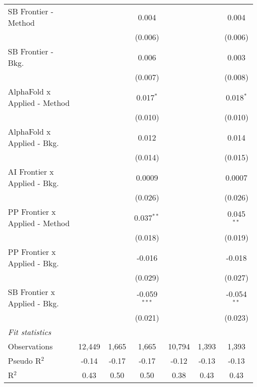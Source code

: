 \begin{tabular}{lcccccc}
   SB Frontier - Method           &               &               & 0.004          &               &             & 0.004\\   
                                  &               &               & (0.006)        &               &             & (0.006)\\   
   SB Frontier - Bkg.             &               &               & 0.006          &               &             & 0.003\\   
                                  &               &               & (0.007)        &               &             & (0.008)\\   
   AlphaFold x Applied - Method   &               &               & 0.017$^{*}$    &               &             & 0.018$^{*}$\\   
                                  &               &               & (0.010)        &               &             & (0.010)\\   
   AlphaFold x Applied - Bkg.     &               &               & 0.012          &               &             & 0.014\\   
                                  &               &               & (0.014)        &               &             & (0.015)\\   
   AI Frontier x Applied - Bkg.   &               &               & 0.0009         &               &             & 0.0007\\   
                                  &               &               & (0.026)        &               &             & (0.026)\\   
   PP Frontier x Applied - Method &               &               & 0.037$^{**}$   &               &             & 0.045$^{**}$\\   
                                  &               &               & (0.018)        &               &             & (0.019)\\   
   PP Frontier x Applied - Bkg.   &               &               & -0.016         &               &             & -0.018\\   
                                  &               &               & (0.029)        &               &             & (0.027)\\   
   SB Frontier x Applied - Bkg.   &               &               & -0.059$^{***}$ &               &             & -0.054$^{**}$\\   
                                  &               &               & (0.021)        &               &             & (0.023)\\   
   \midrule
   \emph{Fit statistics}\\
   Observations                   & 12,449        & 1,665         & 1,665          & 10,794        & 1,393       & 1,393\\  
   Pseudo R$^2$                   & -0.14         & -0.17         & -0.17          & -0.12         & -0.13       & -0.13\\  
   R$^2$                          & 0.43          & 0.50          & 0.50           & 0.38          & 0.43        & 0.43\\  
   

\end{tabular}
